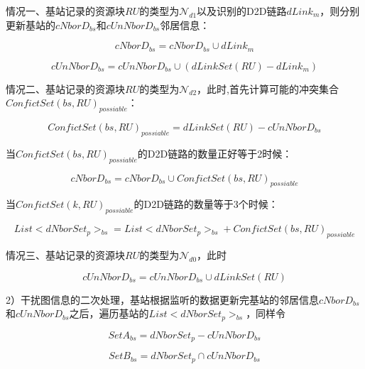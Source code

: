 \documentclass[figurelist,tablelist,algorithmlist,nomlist,masters]{seuthesix}
\begin{document}
	情况一、基站记录的资源块$RU$的类型为$\mathcal{N}_{d1}$以及识别的D2D链路$dLink_m$，则分别更新基站的$cNborD_{bs}$和$cUnNborD_{bs}$邻居信息：
	
	\begin{equation}\label{eq2.21}
	cNborD_{bs} = cNborD_{bs} \cup dLink_m
	\end{equation}
	
	\begin{equation}\label{eq2.22}
	cUnNborD_{bs} = cUnNborD_{bs} \cup (dLinkSet(RU) - dLink_m)
	\end{equation}
	
	情况二、基站记录的资源块$RU$的类型为$\mathcal{N}_{d2}$，此时,首先计算可能的冲突集合$ConfictSet{(bs,RU)_{possiable}}$：
	
	\begin{equation}\label{eq2.23}
	ConfictSet{(bs,RU)_{possiable}} = dLinkSet(RU) - cUnNborD_{bs}
	\end{equation}
	
	
	当$ConfictSet{(bs,RU)_{possiable}}$的D2D链路的数量正好等于2时候：
	
	\begin{equation}\label{eq2.24}
	cNborD_{bs} = cNborD_{bs} \cup ConfictSet{(bs,RU)_{possiable}}
	\end{equation}
	
	当$ConfictSet{(k,RU)_{possiable}}$的D2D链路的数量等于3个时候：
	
	\begin{equation}\label{eq2.25}
	List < dNborSet_{p}{ > _{bs}} = List < dNborSet_{p}{ > _{bs}} + ConfictSet{(bs,RU)_{possiable}}
	\end{equation}
	
	
	情况三、基站记录的资源块$RU$的类型为$\mathcal{N}_{d0}$，此时
	
	\begin{equation}\label{eq2.26}
	cUnNborD_{bs} = cUnNborD_{bs} \cup dLinkSet(RU)
	\end{equation}
	
	
	2）干扰图信息的二次处理，基站根据监听的数据更新完基站的邻居信息$cNborD_{bs}$和$cUnNborD_{bs}$之后，遍历基站的$List < dNborSet_{p}{ > _{bs}}$，同样令
	
	\begin{equation}\label{eq2.27}
	Set{A_{bs}} = dNborSet_{p} - cUnNborD_{bs}
	\end{equation}
	
	\begin{equation}\label{eq2.28}
	Set{B_{bs}} = dNborSet_{p} \cap cUnNborD_{bs}
	\end{equation}
	
\end{document}
